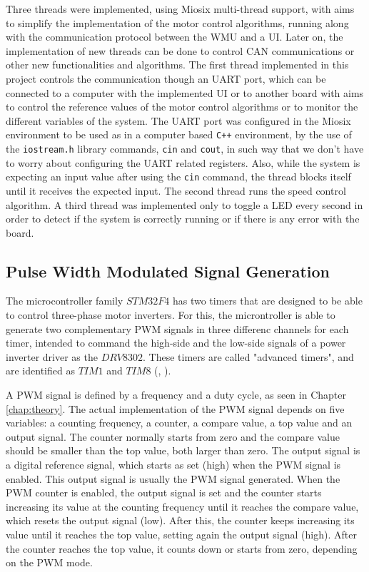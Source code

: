 Three threads were implemented, using Miosix multi-thread support, with aims to simplify the implementation of the motor control algorithms, running along with the communication protocol between the \ac{WMU} and a \acf{UI}. Later on, the implementation of new threads can be done to control \ac{CAN} communications or other new functionalities and algorithms. The first thread implemented in this project controls the communication though an \acf{UART} port, which can be connected to a computer with the implemented \ac{UI} or to another board with aims to control the reference values of the motor control algorithms or to monitor the different variables of the system. The \ac{UART} port was configured in the Miosix environment to be used as in a computer based \texttt{C++} environment, by the use of the \texttt{iostream.h} library commands, \texttt{cin} and \texttt{cout}, in such way that we don't have to worry about configuring the \ac{UART} related registers. Also, while the system is expecting an input value after using the \texttt{cin} command, the thread blocks itself until it receives the expected input. The second thread runs the speed control algorithm. A third thread was implemented only to toggle a LED every second in order to detect if the system is correctly running or if there is any error with the board.

\subsection{Pulse Width Modulated Signal Generation}

The microcontroller family $STM32F4$ has two timers that are designed to be able to control three-phase motor inverters. For this, the microntroller is able to generate two complementary \ac{PWM} signals in three differenc channels for each timer, intended to command the high-side and the low-side signals of a power inverter driver as the $DRV8302$. These timers are called "advanced timers", and are identified as $TIM1$ and $TIM8$ (\citeauthor{stm32}, \citeyear{stm32}).

A \ac{PWM} signal is defined by a frequency and a duty cycle, as seen in Chapter \ref{chap:theory}. The actual implementation of the \ac{PWM} signal depends on five variables: a counting frequency, a counter, a compare value, a top value and an output signal. The counter normally starts from zero and the compare value should be smaller than the top value, both larger than zero. The output signal is a digital reference signal, which starts as set (high) when the \ac{PWM} signal is enabled. This output signal is usually the \ac{PWM} signal generated. When the \ac{PWM} counter is enabled, the output signal is set and the counter starts increasing its value at the counting frequency until it reaches the compare value, which resets the output signal (low). After this, the counter keeps increasing its value until it reaches the top value, setting again the output signal (high). After the counter reaches the top value, it counts down or starts from zero, depending on the \ac{PWM} mode.

